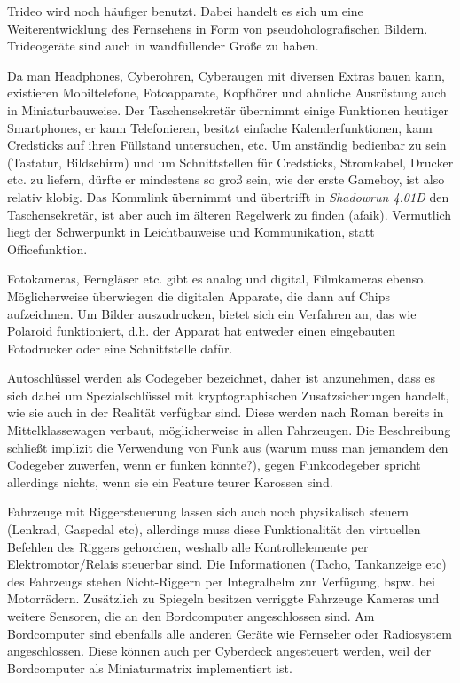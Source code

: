 \documentclass[a4paper]{scrartcl}
\begin{document}
Trideo wird noch häufiger benutzt. Dabei handelt es sich um eine Weiterentwicklung des Fernsehens in Form von
pseudoholografischen Bildern.
Trideogeräte sind auch in wandfüllender Größe zu haben.

Da man Headphones, Cyberohren, Cyberaugen mit diversen Extras bauen kann, existieren Mobiltelefone, Fotoapparate, 
Kopfhörer und ahnliche Ausrüstung auch in Miniaturbauweise.
Der Taschensekretär übernimmt einige Funktionen heutiger Smartphones, er kann Telefonieren, besitzt einfache 
Kalenderfunktionen, kann Credsticks auf ihren Füllstand untersuchen, etc.
Um anständig bedienbar zu sein (Tastatur, Bildschirm) und um Schnittstellen für Credsticks, Stromkabel, Drucker etc. 
zu liefern, dürfte er mindestens so groß sein, wie der erste Gameboy, ist also relativ klobig.
Das Kommlink übernimmt und übertrifft in \textit{Shadowrun 4.01D} den Taschensekretär, ist aber auch im älteren 
Regelwerk zu finden (afaik).
Vermutlich liegt der Schwerpunkt in Leichtbauweise und Kommunikation, statt Officefunktion.

Fotokameras, Ferngläser etc. gibt es analog und digital, Filmkameras ebenso.
Möglicherweise überwiegen die digitalen Apparate, die dann auf Chips aufzeichnen.
Um Bilder auszudrucken, bietet sich ein Verfahren an, das wie Polaroid funktioniert, d.h. der Apparat hat entweder 
einen eingebauten Fotodrucker oder eine Schnittstelle dafür.

Autoschlüssel werden als Codegeber bezeichnet, daher ist anzunehmen, dass es sich dabei um Spezialschlüssel mit
kryptographischen Zusatzsicherungen handelt, wie sie auch in der Realität verfügbar sind.
Diese werden nach Roman bereits in Mittelklassewagen verbaut, möglicherweise in allen Fahrzeugen.
Die Beschreibung schließt implizit die Verwendung von Funk aus (warum muss man jemandem den Codegeber zuwerfen, wenn 
er funken könnte?), gegen Funkcodegeber spricht allerdings nichts, wenn sie ein Feature teurer Karossen sind.

Fahrzeuge mit Riggersteuerung lassen sich auch noch physikalisch steuern (Lenkrad, Gaspedal etc), allerdings muss 
diese Funktionalität den virtuellen Befehlen des Riggers gehorchen, weshalb alle Kontrollelemente per Elektromotor/Relais
steuerbar sind.
Die Informationen (Tacho, Tankanzeige etc) des Fahrzeugs stehen Nicht-Riggern per Integralhelm zur Verfügung, bspw. bei 
Motorrädern.
Zusätzlich zu Spiegeln besitzen verriggte Fahrzeuge Kameras und weitere Sensoren, die an den Bordcomputer angeschlossen sind.
Am Bordcomputer sind ebenfalls alle anderen Geräte wie Fernseher oder Radiosystem angeschlossen.
Diese können auch per Cyberdeck angesteuert werden, weil der Bordcomputer als Miniaturmatrix implementiert ist.
\end{document}
